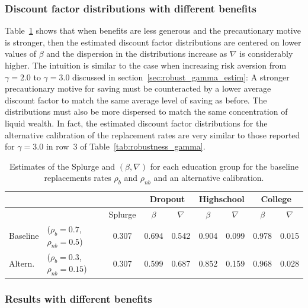 \documentclass[../HAFiscal]{subfiles}
\begin{document}
\subsubsection{Discount factor distributions with different benefits}
\label{sec:robust_benefits_estim}

Table~\ref{tab:robustness_benefits} shows that when benefits are less generous and the precautionary motive is stronger, then the estimated discount factor distributions are centered on lower values of $\beta$ and the dispersion in the distributions increase as $\nabla$ is considerably higher. The intuition is similar to the case when increasing risk aversion from $\gamma=2.0$ to $\gamma=3.0$ discussed in section~\ref{sec:robust_gamma_estim}: A stronger precautionary motive for saving must be counteracted by a lower average discount factor to match the same average level of saving as before. The distributions must also be more dispersed to match the same concentration of liquid wealth. In fact, the estimated discount factor distributions for the alternative calibration of the replacement rates are very similar to those reported for $\gamma=3.0$ in row~3 of Table~\ref{tab:robustness_gamma}. 

\begin{table}[t]
\begin{center}
	\begin{tabular}{llc|cccccc} 
		\toprule
		& & & \multicolumn{2}{c}{Dropout} & \multicolumn{2}{c}{Highschool} & \multicolumn{2}{c}{College} \\ \midrule 
		& & Splurge & $\beta$ & $\nabla$ & $\beta$ & $\nabla$ & $\beta$ & $\nabla$ \\ \midrule 
		Baseline & ($\rho_{b}=0.7$, $\rho_{nb}=0.5$) & 0.307 & 0.694 & 0.542 & 0.904 & 0.099 & 0.978 & 0.015 \\ 
		Altern. & ($\rho_{b}=0.3$,  $\rho_{nb}=0.15$) & 0.307 & 0.599 & 0.687 & 0.852 & 0.159 & 0.968 & 0.028
		\\ \bottomrule 
	\end{tabular}
\end{center}
\caption{Estimates of the Splurge and $(\beta,\nabla)$ for each education group for the baseline replacements rates $\rho_{b}$ and $\rho_{nb}$ and an alternative calibration.}
\label{tab:robustness_benefits}
\end{table}


\FloatBarrier
\subsubsection{Results with different benefits}
\label{sec:robust_benefits_results}
\end{document}
